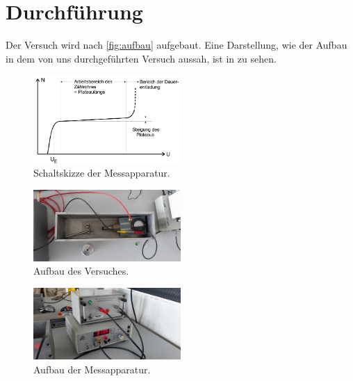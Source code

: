 \section{Durchführung}
\label{sec:Durchführung}

Der Versuch wird nach \autoref{fig:aufbau} aufgebaut. Eine Darstellung, wie der Aufbau in dem von uns durchgeführten Versuch aussah, ist in zu sehen.
\begin{figure}[H]
    \centering
    \includegraphics[width=0.5\textwidth]{data/charakteristik.png}
    \caption{Schaltskizze der Messapparatur.}
    \label{fig:aufbau}
\end{figure}

\begin{figure}[H]
    \centering
    \includegraphics[width=0.5\textwidth]{data/kasten.jpg}
    \caption{Aufbau des Versuches.}
    \label{fig:aufbau1}
\end{figure}

\begin{figure}[H]
    \centering
    \includegraphics[width=0.5\textwidth]{data/geigerMueller.jpg}
    \caption{Aufbau der Messapparatur.}
    \label{fig:aufbau2}
\end{figure}

